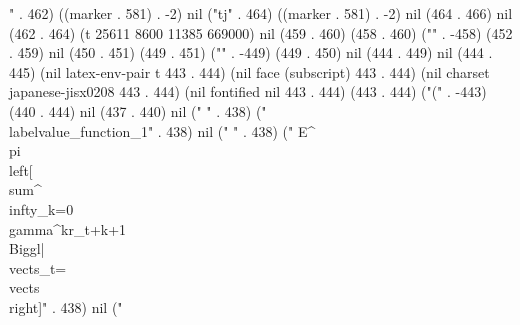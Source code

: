 {{{{{{{{{{{{{" . 462) ((marker . 581) . -2) nil ("tj" . 464) ((marker . 581) . -2) nil (464 . 466) nil (462 . 464) (t 25611 8600 11385 669000) nil (459 . 460) (458 . 460) ("{" . -458) (452 . 459) nil (450 . 451) (449 . 451) ("{" . -449) (449 . 450) nil (444 . 449) nil (444 . 445) (nil latex-env-pair t 443 . 444) (nil face (subscript) 443 . 444) (nil charset japanese-jisx0208 443 . 444) (nil fontified nil 443 . 444) (443 . 444) ("(" . -443) (440 . 444) nil (437 . 440) nil ("
" . 438) (" \\label{value_function_1}" . 438) nil ("
" . 438) (" E^{\\pi}\\left[\\sum^{\\infty}_{k=0}\\gamma^kr_{t+k+1}\\Biggl|\\vect{s}_t=\\vect{s}\\right]" . 438) nil ("
}}}}}}}}}}}}}}}
